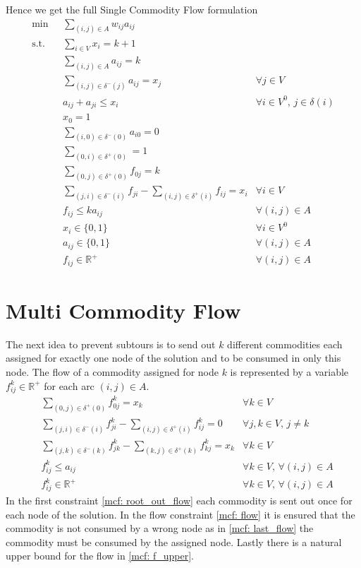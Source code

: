 \documentclass{article}
\newcommand{\R}{\mathbb{R}}
\begin{document}
	\newpage
	Hence we get the full Single Commodity Flow formulation
	\begin{align*}
		\min & \sum_{(i,j) \in A} w_{ij} a_{ij} 	\\
		\text{s.t.} \quad & \sum_{i \in V} x_i = k+1  \\
		& \sum_{(i,j) \in A} a_{ij} = k \\ 
		& \sum_{(i,j) \in \delta^-(j)} a_{ij} = x_j & \forall j \in V  \\	
		& a_{ij} + a_{ji} \leq x_i & \forall i \in V^0, \, j \in \delta(i)  \\
		& x_0 = 1 \\
		& \sum_{(i,0) \in \delta^-(0)} a_{i0} = 0	\\
		& \sum_{(0,i) \in \delta^+(0)} = 1 \\
		& \sum_{(0,j) \in \delta^+(0)} f_{0j} = k \\
		& \sum_{(j,i) \in \delta^-(i)} f_{ji} - \sum_{(i,j) \in \delta^+(i)} f_{ij} = x_i & \forall i \in V \\
		& f_{ij} \leq k a_{ij} & \forall (i,j) \in A  \\
		& x_i \in \lbrace 0,1 \rbrace & \forall i \in V^0  \\
		& a_{ij} \in \lbrace 0,1 \rbrace & \forall (i,j) \in A \\
		& f_{ij} \in \R^+ & \forall (i,j) \in A
	\end{align*}
	
	\newpage
	\section{Multi Commodity Flow}
	The next idea to prevent subtours is to send out $k$ different commodities each assigned for exactly one node of the solution and to be consumed in only this node. The flow of a commodity assigned for node $k$ is represented by a variable $f_{ij}^k \in \R^+$ for each arc $(i,j) \in A$.
	\begin{align}
		&\sum_{(0,j) \in \delta^+(0)} f_{0j}^k = x_k & \forall k \in V \label{mcf: root_out_flow} \\
		&\sum_{(j,i) \in \delta^-(i)} f_{ji}^k - \sum_{(i,j) \in \delta^+(i)} f_{ij}^k = 0 & \forall j,k \in V, \, j \neq k  \label{mcf: flow} \\
		&\sum_{(j,k) \in \delta^-(k)} f_{jk}^k - \sum_{(k,j) \in \delta^+(k)} f_{kj}^k = x_k & \forall k \in V  \label{mcf: last_flow} \\
		&f_{ij}^k \leq a_{ij} & \forall k \in V, \, \forall (i,j) \in A \label{mcf: f_upper} \\
		&f_{ij}^k \in \R^+ & \forall k \in V, \, \forall (i,j) \in A \label{mcf: f}
	\end{align}
	In the first constraint \eqref{mcf: root_out_flow} each commodity is sent out once for each node of the solution. In the flow constraint \eqref{mcf: flow} it is ensured that the commodity is not consumed by a wrong node as in \eqref{mcf: last_flow} the commodity must be consumed by the assigned node. Lastly there is a natural upper bound for the flow in \eqref{mcf: f_upper}.
	
\end{document}
